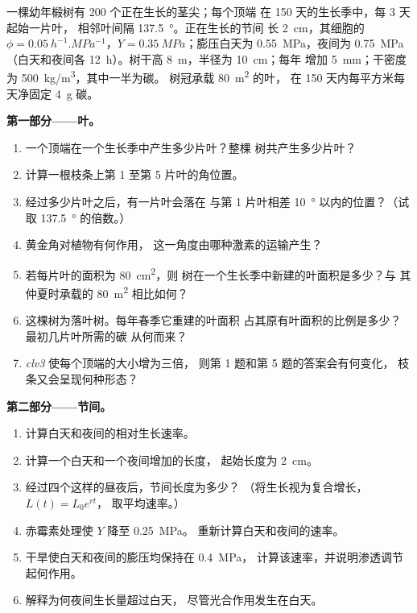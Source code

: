\begin{problem}
\label{pb:b2:plant-meristems:1}
一棵幼年椴树有 \num{200} 个正在生长的茎尖；每个顶端
在 \num{150} 天的生长季中，每 \num{3} 天起始一片叶，
相邻叶间隔 \qty{137.5}{\degree}。正在生长的节间
长 \qty{2}{cm}，其细胞的 $\phi = \qty{0.05}{h^{-1}.MPa^{-1}}$，$Y =
\qty{0.35}{MPa}$；膨压白天为 \qty{0.55}{MPa}，夜间为
\qty{0.75}{MPa}（白天和夜间各 \qty{12}{h}）。树干高
\qty{8}{m}，半径为 \qty{10}{cm}；每年
增加 \qty{5}{mm}；干密度为 \qty{500}{kg/m^3}，其中一半为碳。
树冠承载 \qty{80}{m^2} 的叶，
在 \num{150} 天内每平方米每天净固定 \qty{4}{g} 碳。

\medskip
\noindent\textbf{第一部分——叶。}
\begin{enumerate}
  \item 一个顶端在一个生长季中产生多少片叶？整棵
        树共产生多少片叶？
  \item 计算一根枝条上第 1 至第 5 片叶的角位置。
  \item 经过多少片叶之后，有一片叶会落在
        与第 1 片叶相差 \qty{10}{\degree} 以内的位置？（试取
        \qty{137.5}{\degree} 的倍数。）
  \item 黄金角对植物有何作用，
        这一角度由哪种激素的运输产生？
  \item 若每片叶的面积为 \qty{80}{cm^2}，则
        树在一个生长季中新建的叶面积是多少？与
        其仲夏时承载的 \qty{80}{m^2} 相比如何？
  \item 这棵树为落叶树。每年春季它重建的叶面积
        占其原有叶面积的比例是多少？最初几片叶所需的碳
        从何而来？
  \item \emph{clv3} 使每个顶端的大小增为三倍，
        则第 1 题和第 5 题的答案会有何变化，
        枝条又会呈现何种形态？
\end{enumerate}

\medskip
\noindent\textbf{第二部分——节间。}
\begin{enumerate}[resume]
  \item 计算白天和夜间的相对生长速率。
  \item 计算一个白天和一个夜间增加的长度，
        起始长度为 \qty{2}{cm}。
  \item 经过四个这样的昼夜后，节间长度为多少？
        （将生长视为复合增长，$L(t) = L_0 e^{rt}$，
        取平均速率。）
  \item 赤霉素处理使 $Y$ 降至 \qty{0.25}{MPa}。
        重新计算白天和夜间的速率。
  \item 干旱使白天和夜间的膨压均保持在 \qty{0.4}{MPa}，
        计算该速率，并说明渗透调节起何作用。
  \item 解释为何夜间生长量超过白天，
        尽管光合作用发生在白天。
\end{enumerate}


\end{problem}
